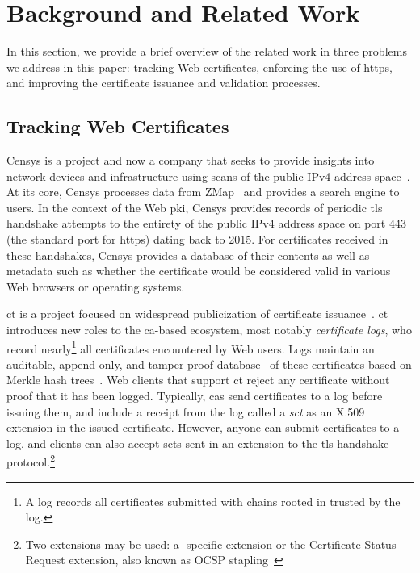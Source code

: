 \section{Background and Related Work}
\label{sec:background}

In this section, we provide a brief overview of the related work in
three problems we address in this paper: tracking Web certificates, enforcing
the use of \ac{https}, and improving the certificate issuance and validation
processes.

\subsection{Tracking Web Certificates}

Censys is a project and now a company that seeks to provide insights into
network devices and infrastructure using scans of the public IPv4 address
space~\cite{durumeric2015search}. At its core, Censys processes data from
ZMap~\cite{durumeric2013zmap} and provides a search engine to users. In the
context of the Web \ac{pki}, Censys provides records of periodic \ac{tls}
handshake attempts to the entirety of the public IPv4 address space on port 443
(the standard port for \ac{https}) dating back to 2015. For certificates
received in these handshakes, Censys provides a database of their contents as
well as metadata such as whether the certificate would be considered valid in
various Web browsers or operating systems.

\acf{ct} is a project focused on widespread publicization of certificate
issuance~\cite{rfc6962}. \ac{ct} introduces new roles to the \ac{ca}-based
ecosystem, most notably \emph{certificate logs}, who record nearly\footnote{A
  log records all certificates submitted with chains rooted in  trusted
by the log.} all certificates encountered by Web users. Logs maintain an
auditable, append-only, and tamper-proof database~\cite{crosby2009efficient} of
these certificates based on Merkle hash trees~\cite{merkle1988digital}. Web
clients that support \ac{ct} reject any certificate without proof that it has
been logged. Typically, \acp{ca} send certificates to a log before issuing them,
and include a receipt from the log called a \emph{\ac{sct}} as an X.509
extension in the issued certificate. However, anyone can submit certificates to
a log, and clients can also accept \acp{sct} sent in an extension to the
\ac{tls} handshake protocol.\footnote{Two extensions may be used: a
-specific extension or the Certificate Status Request extension, also
known as OCSP stapling~\cite{rfc6066}}


